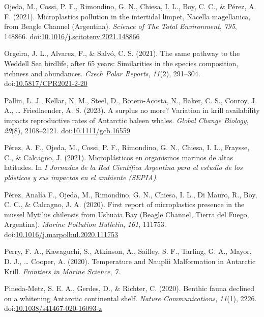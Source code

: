 \documentclass[
]{article}
\newlength{\cslhangindent}
\newenvironment{CSLReferences}[2] %
 {\begin{list}{}{%
  \setlength{\itemindent}{0pt}
  \setlength{\leftmargin}{0pt}
  \setlength{\parsep}{0pt}
  \ifodd #1
   \setlength{\leftmargin}{\cslhangindent}
   \setlength{\itemindent}{-1\cslhangindent}
  \fi
  \setlength{\itemsep}{#2\baselineskip}}}
 {\end{list}}
\begin{document}
\begin{CSLReferences}{1}{0}
Ojeda, M., Cossi, P. F., Rimondino, G. N., Chiesa, I. L., Boy, C. C., \&
Pérez, A. F. (2021). Microplastics pollution in the intertidal limpet,
{Nacella} magellanica, from {Beagle Channel} ({Argentina}).
\emph{Science of The Total Environment}, \emph{795}, 148866.
doi:\href{https://doi.org/10.1016/j.scitotenv.2021.148866}{10.1016/j.scitotenv.2021.148866}

Orgeira, J. L., Alvarez, F., \& Salvó, C. S. (2021). The same pathway to
the {Weddell Sea} birdlife, after 65 years: Similarities in the species
composition, richness and abundances. \emph{Czech Polar Reports},
\emph{11}(2), 291--304.
doi:\href{https://doi.org/10.5817/CPR2021-2-20}{10.5817/CPR2021-2-20}

Pallin, L. J., Kellar, N. M., Steel, D., Botero-Acosta, N., Baker, C.
S., Conroy, J. A., \ldots{} Friedlaender, A. S. (2023). A surplus no
more? {Variation} in krill availability impacts reproductive rates of
{Antarctic} baleen whales. \emph{Global Change Biology}, \emph{29}(8),
2108--2121.
doi:\href{https://doi.org/10.1111/gcb.16559}{10.1111/gcb.16559}

Pérez, A. F., Ojeda, M., Cossi, P. F., Rimondino, G. N., Chiesa, I. L.,
Fraysse, C., \& Calcagno, J. (2021). {Microplásticos en organismos
marinos de altas latitudes}. In \emph{{I Jornadas de la Red Científica
Argentina para el estudio de los plásticos y sus impactos en el ambiente
(SEPIA)}}.

Pérez, Analía F., Ojeda, M., Rimondino, G. N., Chiesa, I. L., Di Mauro,
R., Boy, C. C., \& Calcagno, J. A. (2020). First report of microplastics
presence in the mussel {Mytilus} chilensis from {Ushuaia Bay} ({Beagle
Channel}, {Tierra} del {Fuego}, {Argentina}). \emph{Marine Pollution
Bulletin}, \emph{161}, 111753.
doi:\href{https://doi.org/10.1016/j.marpolbul.2020.111753}{10.1016/j.marpolbul.2020.111753}

Perry, F. A., Kawaguchi, S., Atkinson, A., Sailley, S. F., Tarling, G.
A., Mayor, D. J., \ldots{} Cooper, A. (2020).
Temperature and {Nauplii
Malformation} in {Antarctic Krill}. \emph{Frontiers in Marine Science},
\emph{7}.

Pineda-Metz, S. E. A., Gerdes, D., \& Richter, C. (2020). Benthic fauna
declined on a whitening {Antarctic} continental shelf. \emph{Nature
Communications}, \emph{11}(1), 2226.
doi:\href{https://doi.org/10.1038/s41467-020-16093-z}{10.1038/s41467-020-16093-z}


\end{CSLReferences}
\end{document}
